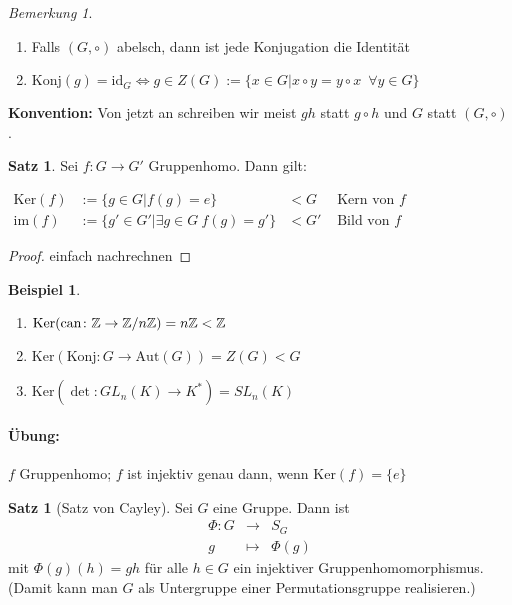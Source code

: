 \documentclass[12pt,a4paper]{article}
\newcounter{thmcounter}[subsection]
\theoremstyle{definition}
\theoremstyle{remark}
\newtheorem*{bem}{Bemerkung}
\theoremstyle{definition}
\newtheorem{satz}[thmcounter]{Satz}
\theoremstyle{definition}
\newtheorem*{bsp}{Beispiel}
\theoremstyle{plain}
\theoremstyle{plain}
\begin{document}
\begin{bem}
	\leavevmode
	\begin{enumerate}
		\item 	Falls $(G,\circ)$ abelsch, dann ist jede Konjugation die Identität
		\item $\text{Konj}(g) = \text{id}_G \Leftrightarrow g\in Z(G):=\{x\in G|x\circ y = y\circ x\enspace \forall y\in G\}$
	\end{enumerate}
\end{bem}

\textbf{Konvention:} Von jetzt an schreiben wir meist $gh$ statt $g\circ h$ und $G$ statt $(G,\circ)$.

\begin{satz}
	Sei $f\colon G\to G'$ Gruppenhomo. Dann gilt:

\vspace{2mm}	
$	\begin{array}{llll}
		\mbox{Ker}(f) & := \{g\in G|f(g) = e\}                       & <G & \mbox{ Kern von }f\\
		\mbox{im}(f)  & := \{g'\in G'|\exists g\in G\ f(g)=g'\} & <G' & \text{ Bild von }f
	\end{array}$
\end{satz}

\begin{proof}
	einfach nachrechnen
\end{proof}
\begin{bsp}
	\leavevmode
	\begin{enumerate}
		\item $\mbox{Ker}(\text{can}\colon \mathbb Z\to \mathbb Z/n\mathbb Z) = n\mathbb Z<\mathbb Z$
		\item $\mbox{Ker}(\text{Konj}\colon G\to \text{Aut}(G)) = Z(G)<G$
		\item $\mbox{Ker}(\det\colon GL_n(K)\to K^*) = SL_n(K)$
	\end{enumerate}
\end{bsp}

\paragraph{Übung:} $f$ Gruppenhomo; $f$ ist injektiv genau dann, wenn $\text{Ker}(f) = \{e\}$

\begin{satz}[Satz von Cayley]
	Sei $G$ eine Gruppe. Dann ist
	\begin{eqnarray*}
		\Phi \colon G&\to& S_G\\
		g&\mapsto& \Phi(g)
	\end{eqnarray*} mit $\Phi(g)(h) = gh$ für alle $h\in G$ ein injektiver Gruppenhomomorphismus. (Damit kann man $G$ als Untergruppe einer Permutationsgruppe \glqq realisieren\grqq.)
\end{satz}
\end{document}
